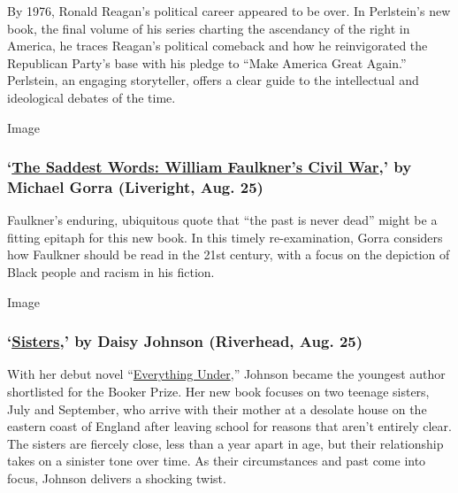 By 1976, Ronald Reagan's political career appeared to be over. In
Perlstein's new book, the final volume of his series charting the
ascendancy of the right in America, he traces Reagan's political
comeback and how he reinvigorated the Republican Party's base with his
pledge to ``Make America Great Again.'' Perlstein, an engaging
storyteller, offers a clear guide to the intellectual and ideological
debates of the time.

Image

\hypertarget{the-saddest-words-william-faulkners-civil-war-by-michael-gorra-liveright-aug-25}{%
\subsubsection{\texorpdfstring{`\href{https://wwnorton.com/books/9781631491702}{The
Saddest Words: William Faulkner's Civil War},' by Michael Gorra
(Liveright, Aug.
25)}{`The Saddest Words: William Faulkner's Civil War,' by Michael Gorra (Liveright, Aug. 25)}}\label{the-saddest-words-william-faulkners-civil-war-by-michael-gorra-liveright-aug-25}}

Faulkner's enduring, ubiquitous quote that ``the past is never dead''
might be a fitting epitaph for this new book. In this timely
re-examination, Gorra considers how Faulkner should be read in the 21st
century, with a focus on the depiction of Black people and racism in his
fiction.

Image

\hypertarget{sisters-by-daisy-johnson-riverhead-aug-25}{%
\subsubsection{\texorpdfstring{`\href{https://www.penguinrandomhouse.com/books/624960/sisters-by-daisy-johnson/}{Sisters},'
by Daisy Johnson (Riverhead, Aug.
25)}{`Sisters,' by Daisy Johnson (Riverhead, Aug. 25)}}\label{sisters-by-daisy-johnson-riverhead-aug-25}}

With her debut novel
``\href{https://www.nytimes3xbfgragh.onion/2018/11/20/books/review/daisy-johnson-everything-under.html}{Everything
Under},'' Johnson became the youngest author shortlisted for the Booker
Prize. Her new book focuses on two teenage sisters, July and September,
who arrive with their mother at a desolate house on the eastern coast of
England after leaving school for reasons that aren't entirely clear. The
sisters are fiercely close, less than a year apart in age, but their
relationship takes on a sinister tone over time. As their circumstances
and past come into focus, Johnson delivers a shocking twist.

